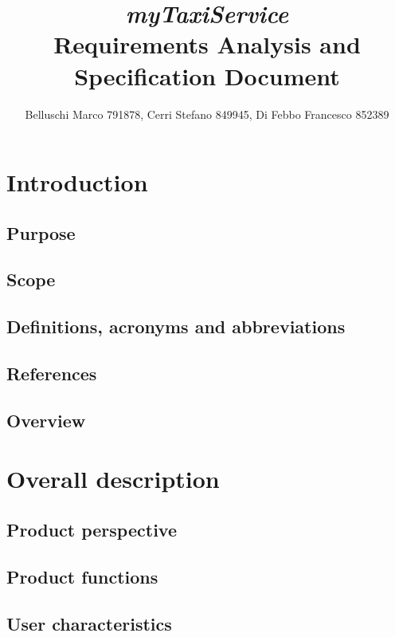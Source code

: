 \documentclass[]{report}
\title{{\Huge\textit{myTaxiService}}\\{\Large Requirements Analysis and Specification Document}}
\author{Belluschi Marco 791878, Cerri Stefano 849945, Di Febbo Francesco 852389}
\begin{document}
\maketitle
\tableofcontents

\chapter{Introduction}

\section{Purpose}


\section{Scope}


\section{Definitions, acronyms and abbreviations}


\section{References}


\section{Overview}


\chapter{Overall description}

\section{Product perspective}


\section{Product functions}


\section{User characteristics}

\end{document}
